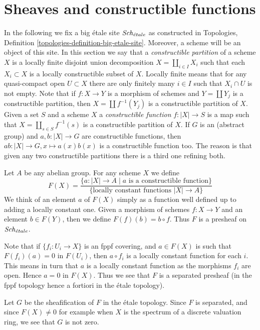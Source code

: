 \section{Sheaves and constructible functions}
\label{section-constructible-functions}

\noindent
In the following we fix a big \'etale site $\mathit{Sch}_{\acute{e}tale}$ as constructed in
Topologies, Definition \ref{topologies-definition-big-etale-site}.
Moreover, a scheme will be an object of this site.
In this section we say that a {\it constructible partition}
of a scheme $X$ is a locally finite disjoint union decomposition
$X = \coprod_{i \in I} X_i$ such that each $X_i \subset X$ is a
locally constructible subset of $X$. Locally finite means that
for any quasi-compact open $U \subset X$ there are only finitely
many $i \in I$ such that $X_i \cap U$ is not empty.
Note that if $f : X \to Y$ is a morphism of schemes and
$Y = \coprod Y_j$ is a constructible partition, then
$X = \coprod f^{-1}(Y_j)$ is a constructible partition of $X$.
Given a set $S$ and a scheme $X$ a {\it constructible function}
$f : |X| \to S$ is a map such that $X = \coprod_{s \in S} f^{-1}(s)$
is a constructible partition of $X$.
If $G$ is an (abstract group) and $a, b : |X| \to G$ are constructible
functions, then $ab : |X| \to G, x \mapsto a(x)b(x)$ is a constructible
function too. The reason is that given any two constructible partitions
there is a third one refining both.

\medskip\noindent
Let $A$ be any abelian group. For any scheme $X$ we define
$$
F(X) =
\frac{\{a : |X| \to A \mid a \text{ is a constructible function}\}}{\{\text{locally constant functions }|X| \to A\}}
$$
We think of an element $a$ of $F(X)$ simply as a function well defined
up to adding a locally constant one. Given a morphism of schemes
$f : X \to Y$ and an element $b \in F(Y)$, then we define
$F(f)(b) = b \circ f$. Thus $F$ is a presheaf on $\mathit{Sch}_{\acute{e}tale}$.

\medskip\noindent
Note that if $\{f_i : U_i \to X\}$ is an fppf covering, and $a \in F(X)$
is such that $F(f_i)(a) = 0$ in $F(U_i)$, then $a \circ f_i$ is a locally
constant function for each $i$. This means in turn that $a$ is a locally
constant function as the morphisms $f_i$ are open. Hence $a = 0$ in $F(X)$.
Thus we see that $F$ is a separated presheaf (in the fppf topology
hence a fortiori in the \'etale topology).

\medskip\noindent
Let $G$ be the sheafification of $F$ in the \'etale topology.
Since $F$ is separated, and since $F(X) \not = 0$ for example when
$X$ is the spectrum of a discrete valuation ring, we see that $G$
is not zero.

